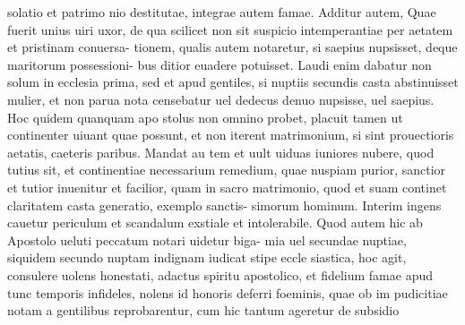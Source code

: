 \documentclass{article}
\begin{document}
\begin{pages}
solatio et patrimo nio destitutae, integrae autem famae. Additur autem, Quae fuerit unius uiri uxor, de qua scilicet non sit suspicio intemperantiae per aetatem et pristinam conuersa- tionem, qualis autem notaretur, si saepius nupsisset, deque maritorum possessioni- bus ditior euadere potuisset. Laudi enim dabatur non solum in ecclesia prima, sed et apud gentiles, si nuptiis secundis casta abstinuisset mulier, et non parua nota censebatur uel dedecus denuo nupsisse, uel saepius. Hoc quidem quanquam apo stolus non omnino probet, placuit tamen ut continenter uiuant quae possunt, et non iterent matrimonium, si sint prouectioris aetatis, caeteris paribus. Mandat au tem et uult uiduas iuniores nubere, quod tutius sit, et continentiae necessarium remedium, quae nuspiam purior, sanctior et tutior inuenitur et facilior, quam in sacro matrimonio, quod et suam continet claritatem casta generatio, exemplo sanctis- simorum hominum. Interim ingens cauetur periculum et scandalum exstiale et intolerabile. Quod autem hic ab Apostolo ueluti peccatum notari uidetur biga- mia uel secundae nuptiae, siquidem secundo nuptam indignam iudicat stipe eccle siastica, hoc agit, consulere uolens honestati, adactus spiritu apostolico, et fidelium famae apud tunc temporis infideles, nolens id honoris deferri foeminis, quae ob im pudicitiae notam a gentilibus reprobarentur, cum hic tantum ageretur de subsidio  \pend

\end{pages}
\end{document}
